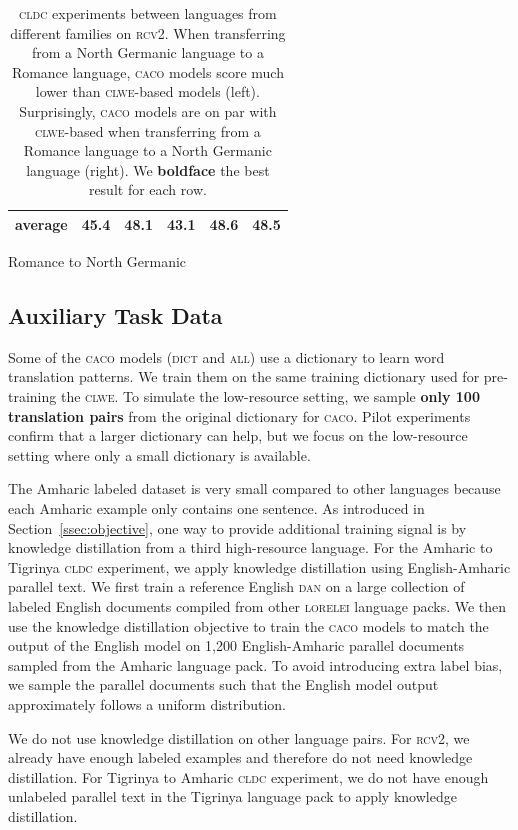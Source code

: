 \documentclass[letterpaper]{article} %
\newcommand{\abr}[1]{\textsc{#1}}
\newcommand{\name}[0]{\textsc{caco}}
\begin{document}
\begin{table}
\begin{subtable}{.47\linewidth}
\begin{tabular}{llccccc}
\multicolumn{2}{r}{average} & 45.4 & 48.1 & 43.1 & {\bf 48.6} & 48.5 \\
\bottomrule
\end{tabular}
\caption{Romance to North Germanic}
\end{subtable}
\caption{\abr{cldc} experiments between languages from different families on
\abr{rcv2}.  When transferring from a North Germanic language to a Romance
language, \name{} models score much lower than \abr{clwe}-based models (left).
Surprisingly, \name{} models are on par with \abr{clwe}-based when
transferring from a Romance language to a North Germanic language (right).
We \textbf{boldface} the best result for each row.}
\label{tab:unrelated}
\end{table}

\subsection{Auxiliary Task Data}

Some of the \name{} models (\abr{dict} and \abr{all}) use a dictionary to learn
word translation patterns.
We train them on the same training dictionary used for pre-training the
\abr{clwe}.
To simulate the low-resource setting, we sample \textbf{only 100 translation
pairs} from the original dictionary for \name{}.
Pilot experiments confirm that a larger dictionary can help, but we focus on
the low-resource setting where only a small dictionary is available.

The Amharic labeled dataset is very small compared to other
languages because each Amharic example only contains one sentence.
As introduced in Section~\ref{ssec:objective}, one way to provide additional
training signal is by knowledge distillation from a third high-resource
language.
For the Amharic to Tigrinya \abr{cldc} experiment, we apply knowledge
distillation using English-Amharic parallel text.
We first train a reference English \abr{dan} on a large collection of labeled
English documents compiled from other \abr{lorelei} language packs.
We then use the knowledge distillation objective to train the \name{} models to
match the output of the English model on 1,200 English-Amharic parallel
documents sampled from the Amharic language pack.
To avoid introducing extra label bias, we sample the parallel documents such
that the English model output approximately follows a uniform distribution.

We do not use knowledge distillation on other language pairs.
For \abr{rcv2}, we already have enough labeled examples and therefore do not
need knowledge distillation.
For Tigrinya to Amharic \abr{cldc} experiment, we do not have enough unlabeled
parallel text in the Tigrinya language pack to apply knowledge distillation.
\end{document}
